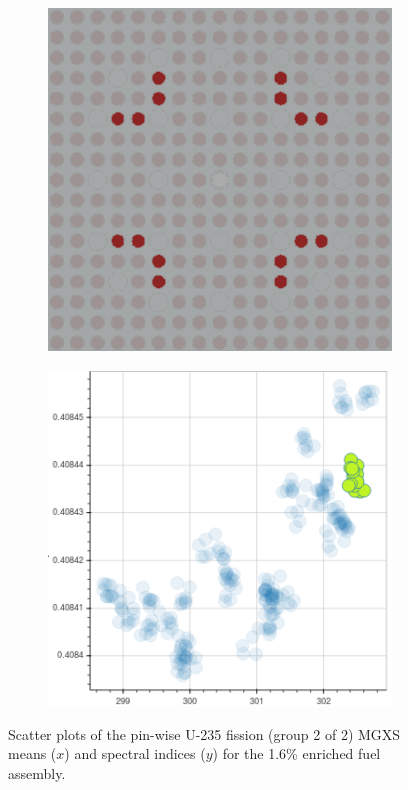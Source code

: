 \begin{figure}[h!]
\begin{subfigure}{0.45\textwidth}
  \caption{}
  \label{fig:chap10-fiss-mean-spect-ind-mgxs-2}
\end{subfigure}
\begin{subfigure}{0.45\textwidth}
  \centering
  \includegraphics[width=0.9\linewidth]{figures/unsupervised/features/assm-16/u235-fiss/mean-spect-ind/geometry-3}
  \caption{}
  \label{fig:chap10-fiss-mean-spect-ind-geom-3}
\end{subfigure}%
\begin{subfigure}{0.45\textwidth}
  \centering
  \includegraphics[width=0.9\linewidth]{figures/unsupervised/features/assm-16/u235-fiss/mean-spect-ind/mgxs-3}
  \caption{}
  \label{fig:chap10-fiss-mean-spect-ind-mgxs-3}
\end{subfigure}
\caption[Clustering of U-235 fission MGXS spectral indices]{Scatter plots of the pin-wise U-235 fission (group 2 of 2) \ac{MGXS} means ($x$) and spectral indices ($y$) for the 1.6\% enriched fuel assembly.}
\label{fig:chap10-mean-spect-ind}
\end{figure}

